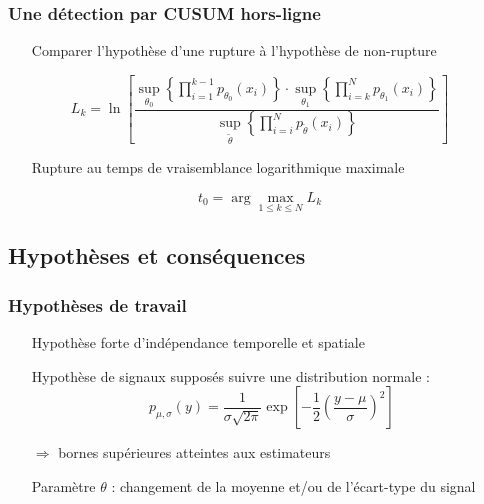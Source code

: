 \documentclass{beamer}
\begin{document}
\begin{frame}

	\frametitle{Une détection par CUSUM hors-ligne}

	\begin{itemize}
		\item[Comparer] l'hypothèse d'une rupture à l'hypothèse de non-rupture
	\end{itemize}

\vspace{-.4cm}
	\begin{equation}
		L _k =\ln \left[ \frac{\sup_{\theta_0}\left\{ \prod_{i=1}^{k-1} p_{\theta_0}(x_i) \right\} \cdot \sup_{\theta_1} \left\{ \prod_{i = k}^{N}p_{\theta_1}(x_i) \right\}}{\sup_{\tilde\theta}\left\{\prod_{i=i}^{N}p_{\tilde{\theta}}(x_i)\right\}} \right]
	\end{equation}
\phantom{kcahkcah}

	\begin{itemize}
		\item[Rupture] au temps de vraisemblance logarithmique maximale
	\end{itemize}

\vspace{-.4cm}
	\begin{equation}
		t_0 = \arg \max_{1 \leq k \leq N} L_k
	\end{equation}
	
\end{frame}

\subsection{Hypothèses et conséquences}

\begin{frame}
	\frametitle{Hypothèses de travail}
	
	\begin{itemize}
		\item[Hypothèse] forte d'indépendance temporelle et spatiale
		\item[Hypothèse] de signaux supposés suivre une distribution normale :
	\begin{equation}
		p_{\mu, \sigma}(y) = \frac1{\sigma\sqrt{2 \pi}} \exp \left[ -\frac12 \left( \frac{y - \mu}{\sigma} \right)^2 \right]
	\end{equation}
		\item[$\Longrightarrow$] bornes supérieures atteintes aux estimateurs
		\vspace{.4cm}
		\item[Paramètre] $\theta$ : changement de la moyenne et/ou de l'écart-type du signal
	\end{itemize}
\end{frame}
\end{document}
